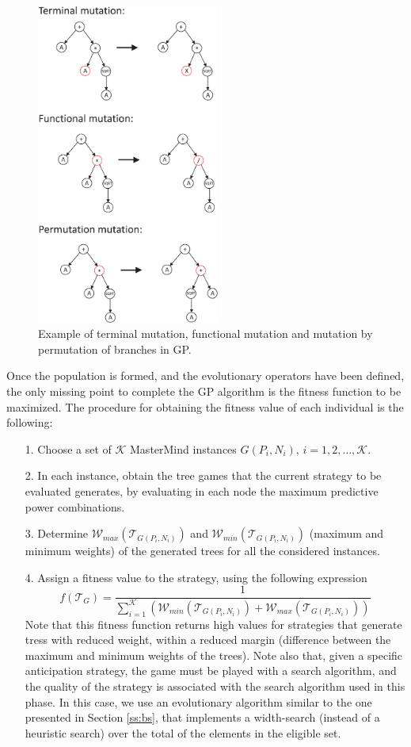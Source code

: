 \begin{figure}[!ht]
\begin{center}
\includegraphics[draft=false,angle=0,width=6cm]{./mutaciones2.eps}
\end{center}
\caption{\label{mutaciones2} Example of terminal mutation, functional mutation and mutation by permutation of branches in GP.}
\end{figure}

Once the population is formed, and the evolutionary operators have been defined, the only missing point to complete the GP algorithm is the fitness function to be maximized. The procedure for obtaining the fitness value of each individual is the following:

\begin{itemize}
\item[1.] Choose a set of $\mathcal{K}$ MasterMind instances $G(P_i,N_i)$, $i=1, 2, \ldots, \mathcal{K}$.
\item[2.] In each instance, obtain the tree games that the current strategy to be evaluated generates, by evaluating in each node the maximum predictive power combinations.
\item[3.] Determine $\mathcal{W}_{max}(\mathcal{T}_{G(P_i,N_i)})$ and $\mathcal{W}_{min}(\mathcal{T}_{G(P_i,N_i)})$ (maximum and minimum weights) of the generated trees for all the considered instances.
\item[4.] Assign a fitness value to the strategy, using the following expression $$f(\mathcal{T}_G)=\frac{1}{\sum_{i=1}^{\mathcal{K}}\left(\mathcal{W}_{min}(\mathcal{T}_{G(P_i,N_i)})+\mathcal{W}_{max}(\mathcal{T}_{G(P_i,N_i)})\right)}$$
Note that this fitness function returns high values for strategies that generate tress with reduced weight, within a reduced margin (difference between the maximum and minimum weights of the trees). Note also that, given a specific anticipation strategy, the game must be played with a search algorithm, and the quality of the strategy is associated with the search algorithm used in this phase. In this case, we use an evolutionary algorithm similar to the one presented in Section \ref{ss:bs}, that implements a width-search (instead of a heuristic search) over the total of the elements in the eligible set.
\end{itemize}

